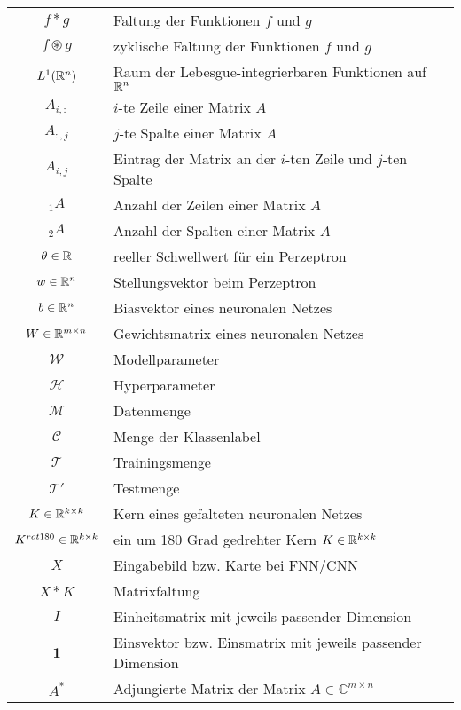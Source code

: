\begin{tabular}{cp{}}
    $f \ast g$ & Faltung der Funktionen $f$ und $g$\\
    $f \circledast g$ & zyklische Faltung der Funktionen $f$ und $g$ \\
    $L^1(\mathbb{R}^n)$ & Raum der Lebesgue-integrierbaren Funktionen auf $\mathbb{R}^n$ \\
    $A_{i,:}$ & $i$-te Zeile einer Matrix $A$ \\
    $A_{:,j}$ & $j$-te Spalte einer Matrix $A$ \\
    $A_{i,j}$ & Eintrag der Matrix an der $i$-ten Zeile und $j$-ten Spalte \\
    ${}_1 A$ & Anzahl der Zeilen einer Matrix $A$ \\
    ${}_2 A$ & Anzahl der Spalten einer Matrix $A$ \\
    $ \theta \in \mathbb{R}$ & reeller Schwellwert für ein Perzeptron\\
    $ w \in \mathbb{R}^n$ & Stellungsvektor beim Perzeptron \\
    $ b \in \mathbb{R}^n$ &Biasvektor eines neuronalen Netzes\\
    $W \in \mathbb{R}^{m \times n}$ &Gewichtsmatrix eines neuronalen Netzes \\
    $\mathcal{W}$ & Modellparameter \\
    $\mathcal{H}$ & Hyperparameter \\
    $\mathcal{M}$ & Datenmenge \\
    $\mathcal{C}$ & Menge der Klassenlabel \\
    $\mathcal{T}$ & Trainingsmenge \\
    $\mathcal{T}'$ & Testmenge \\
    $K \in \mathbb{R}^{k \times k}$ & Kern eines gefalteten neuronalen Netzes \\
    $K^{rot180} \in \mathbb{R}^{k \times k}$ & ein um 180 Grad gedrehter Kern $K \in \mathbb{R}^{k \times k}$ \\
    $X$ & Eingabebild bzw. Karte bei FNN/CNN \\
    $X \ast K$ & Matrixfaltung \\
    $I$ & Einheitsmatrix mit jeweils passender Dimension \\
    $\mathbf{1}$ &Einsvektor bzw. Einsmatrix mit jeweils passender Dimension \\
    $A^*$ & Adjungierte Matrix der Matrix $A \in \mathbb{C}^{m \times n}$\\ 

\end{tabular}
